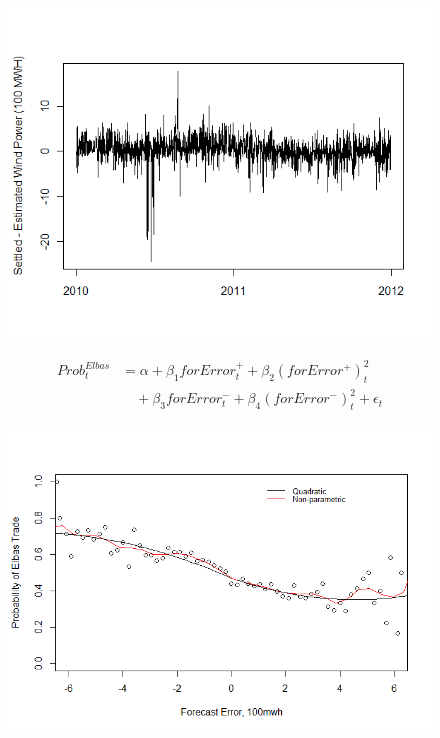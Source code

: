 \documentclass{beamer}
\begin{document}
\begin{frame}[plain]
	\begin{figure}
	\includegraphics[width=1\textwidth]{figures/Settled-Estimated.png}
	\end{figure}
\end{frame}

\begin{frame}[plain]
	\begin{equation}
		\begin{split}
		Prob_t^{Elbas}&=\alpha + \beta_1 forError_t^{+} + \beta_2 (forError^{+})_t^2 \\
		& \quad + \beta_3 forError_t^-+\beta_4 (forError^-)_t^2 + \epsilon_t    
	\label{glm_eqn}
		\end{split}
	\end{equation}
\end{frame}

\begin{frame}[plain]
	\begin{figure}
	\includegraphics[width=1\textwidth]{figures/Rplot04.png}
	\end{figure}
\end{frame}
\end{document}
